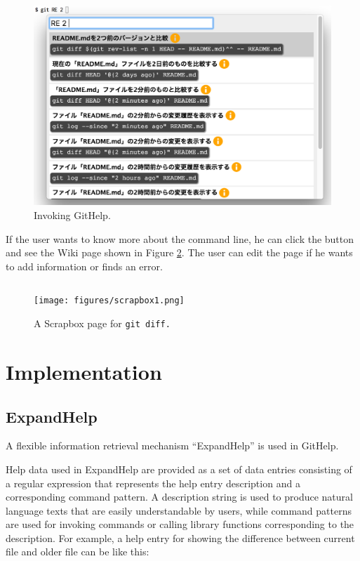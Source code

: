 \documentclass{sigchi}
\def\GH{\textsf{GitHelp}}
\def\SB{\textsf{Scrapbox}}
\def\EH{\textsf{ExpandHelp}}
\begin{document}
\begin{figure}[H]
  \includegraphics[width=12cm,bb=-100 -100 1190 766]{figures/githelp1.png}
  \caption{Invoking {\GH}.}
  \label{bash2}
\end{figure}

If the user wants to know more about the command line,
he can click the
button and see the Wiki page shown in Figure \ref{scrapboxpage}.
The user can edit the page if he wants to add information or finds an error.

\begin{figure}[htb]
\begin{verbatim}
\end{verbatim}
\centerline{\texttt{[image: figures/scrapbox1.png]}}
\caption{A {\SB} page for \tt{git diff}.}
\label{scrapboxpage}
\end{figure}

\section{Implementation}


\subsection{ExpandHelp}

A flexible information retrieval mechanism ``{\EH}'' is used in {\GH}.

Help data used in {\EH} are provided as a set of data entries
consisting of a regular expression that represents the help entry description
and a corresponding command pattern.
A description string is used to produce natural language texts
that are easily understandable by users,
while command patterns are used for invoking commands or calling library functions
corresponding to the description.
%
For example, a help entry for showing the difference between
current file and older file can be like this:
\end{document}
